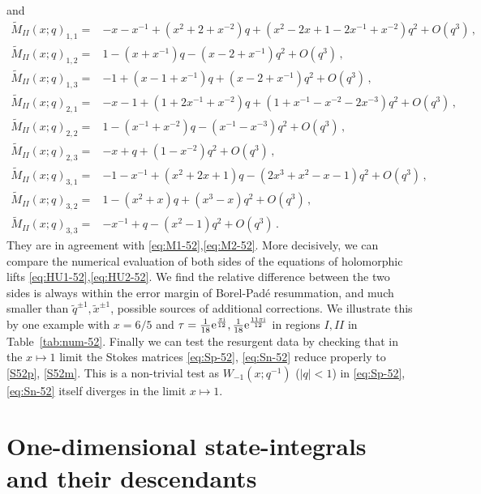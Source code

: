 \documentclass[12pt,reqno]{amsart}
\theoremstyle{definition}
\def\tq{\tilde{q}}
\def\tx{\tilde{x}}
\def\ri{\mathrm{i}}
\def\wt{\widetilde}
\def\tx{\tilde{x}}
\def\re{{\rm e}}
\def\ri{{\rm i}}
\newcommand{\nn}{\nonumber \\}
\begin{document}
and
  \begin{align}
    \wt{M}_{II}(x;q)_{1,1} =
    &-x-x^{-1}+(x^2+2+x^{-2})q+(x^2-2x+1-2x^{-1}+x^{-2})q^2+O(q^3)\,,\nn
      \wt{M}_{II}(x;q)_{1,2} =
    &1-(x+x^{-1})q-(x-2+x^{-1})q^2+O(q^3)\,,\nn
      \wt{M}_{II}(x;q)_{1,3} =
    &-1+(x-1+x^{-1})q+(x-2+x^{-1})q^2+O(q^3)\,,\nn
      \wt{M}_{II}(x;q)_{2,1} =
    &-x-1+(1+2x^{-1}+x^{-2})q+(1+x^{-1}-x^{-2}-2x^{-3})q^2
      +O(q^3)\,,\nn
      \wt{M}_{II}(x;q)_{2,2} =
    &1-(x^{-1}+x^{-2})q-(x^{-1}-x^{-3})q^2+O(q^3)\,,\nn
      \wt{M}_{II}(x;q)_{2,3} =
    &-x+q+(1-x^{-2})q^2+O(q^3)\,,\nn
      \wt{M}_{II}(x;q)_{3,1} =
    &-1-x^{-1}+(x^2+2x+1)q-(2x^3+x^2-x-1)q^2+O(q^3)\,,\nn
      \wt{M}_{II}(x;q)_{3,2} =
    &1-(x^2+x)q+(x^3-x)q^2+O(q^3)\,,\nn
      \wt{M}_{II}(x;q)_{3,3} =
    &-x^{-1}+q-(x^2-1)q^2+O(q^3)\,.
  \end{align}
  They are in agreement with \eqref{eq:M1-52},\eqref{eq:M2-52}.  More
  decisively, we can compare the numerical evaluation of both sides of
  the equations of holomorphic lifts
  \eqref{eq:HU1-52},\eqref{eq:HU2-52}.  We find the relative
  difference between the two sides is always within the error margin
  of Borel-Pad\'e resummation, and much smaller than
  $\tq^{\pm 1},\tx^{\pm 1}$, possible sources of additional
  corrections.  We illustrate this by one example with $x=6/5$ and
  $\tau=\frac{1}{18}\re^{\frac{\pi\ri}{12}},
  \frac{1}{18}\re^{\frac{11\pi\ri}{12}}$ in regions
  $I,II$ in Table~\ref{tab:num-52}.  Finally we can test the resurgent
  data by checking that in the $x\mapsto 1$ limit the Stokes matrices
  \eqref{eq:Sp-52}, \eqref{eq:Sn-52} reduce properly to \eqref{S52p},
  \eqref{S52m}.  This is a non-trivial test as $W_{-1}(x;q^{-1})$
  ($|q|<1$) in \eqref{eq:Sp-52}, \eqref{eq:Sn-52} itself diverges in
  the limit $x\mapsto 1$.


\section{One-dimensional state-integrals and their
    descendants}
\label{sec.onedim}
\end{document}
